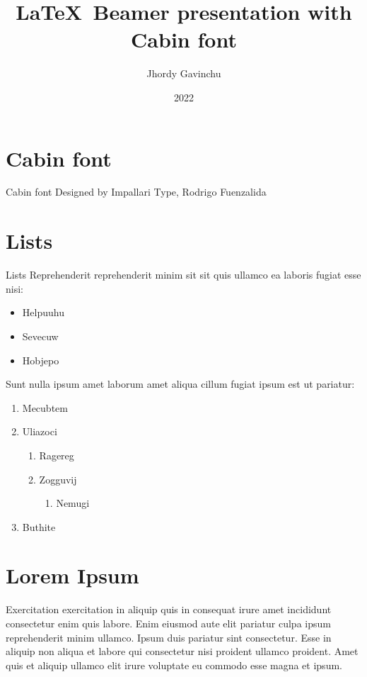 \documentclass{beamer}
\title{\LaTeX\, Beamer presentation with Cabin font}
\author{Jhordy Gavinchu}
\institute{\href{https://jhordyess.com}{Jhordyess}}
\date{2022}
\begin{document}
\begin{frame}
  \titlepage
\end{frame}

\section{Cabin font}

\begin{frame}{Cabin font}
  Designed by Impallari Type, Rodrigo Fuenzalida
  \href{https://fonts.google.com/specimen/Cabin/tester}{}
\end{frame}

\section{Lists}

\begin{frame}{Lists}
Reprehenderit reprehenderit minim sit sit quis ullamco ea laboris fugiat esse nisi:
\begin{itemize}
    \item Helpuuhu
    \item Sevecuw
    \item Hobjepo
\end{itemize}

Sunt nulla ipsum amet laborum amet aliqua cillum fugiat ipsum est ut pariatur:
\begin{enumerate}
    \item Mecubtem
    \item Uliazoci
    \begin{enumerate}
      \item Ragereg
      \item Zogguvij
      \begin{enumerate}
        \item Nemugi
      \end{enumerate} 
    \end{enumerate} 
    \item Buthite
\end{enumerate}
\end{frame}

\section{Lorem Ipsum}

\begin{frame}
  Exercitation exercitation in aliquip quis in consequat irure amet incididunt consectetur enim quis labore. Enim eiusmod aute elit pariatur culpa ipsum reprehenderit minim ullamco. Ipsum duis pariatur sint consectetur. Esse in aliquip non aliqua et labore qui consectetur nisi proident ullamco proident. Amet quis et aliquip ullamco elit irure voluptate eu commodo esse magna et ipsum.
\end{frame}
\end{document}
